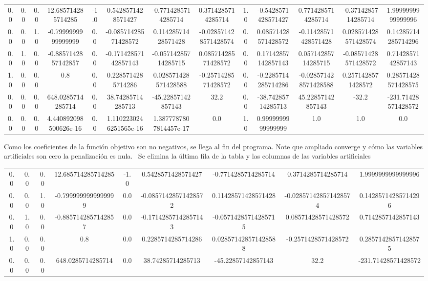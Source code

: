 \documentclass{article} %
\begin{document}
\begin{center}
\begin{tabular}{|cccccccccccc|c|}\hline
0.0 & 0.0 & 0.0 & 12.685714285714285 & -1.0 & 0.5428571428571427 & -0.7714285714285714 & 0.3714285714285714 & 1.0 & -0.5428571428571427 & 0.7714285714285714 & -0.3714285714285714 & 1.9999999999999996  \\
0.0 & 0.0 & 1.0 & -0.7999999999999999 & 0.0 & -0.08571428571428572 & 0.11428571428571428 & -0.028571428571428574 & 0.0 & 0.08571428571428572 & -0.11428571428571428 & 0.028571428571428574 & 0.14285714285714296  \\
0.0 & 1.0 & 0.0 & -0.8857142857142857 & 0.0 & -0.17142857142857143 & -0.05714285714285715 & 0.08571428571428572 & 0.0 & 0.17142857142857143 & 0.05714285714285715 & -0.08571428571428572 & 0.7142857142857143  \\
1.0 & 0.0 & 0.0 & 0.8 & 0.0 & 0.2285714285714286 & 0.028571428571428588 & -0.2571428571428572 & 0.0 & -0.2285714285714286 & -0.028571428571428588 & 0.2571428571428572 & 0.28571428571428575  \\
\hline
0.0 & 0.0 & 0.0 & 648.0285714285714 & 0.0 & 38.74285714285713 & -45.22857142857143 & 32.2 & 0.0 & -38.74285714285713 & 45.22857142857143 & -32.2 & -231.71428571428572  \\
0.0 & 0.0 & 0.0 & 4.440892098500626e-16 & 0.0 & 1.1102230246251565e-16 & 1.3877787807814457e-17 & 0.0 & 1.0 & 0.9999999999999999 & 1.0 & 1.0 & 0.0  \\
\hline
\end{tabular}
\end{center}
Como los coeficientes de la función objetivo son no negativos, se llega al fin del programa.
Note que ampliado converge y cómo las variables artificiales son cero la penalización es nula. \
Se elimina la última fila de la tabla y las columnas de las variables artificiales
\begin{center}
\begin{tabular}{|cccccccc|c|}\hline
0.0 & 0.0 & 0.0 & 12.685714285714285 & -1.0 & 0.5428571428571427 & -0.7714285714285714 & 0.3714285714285714 & 1.9999999999999996  \\
0.0 & 0.0 & 1.0 & -0.7999999999999999 & 0.0 & -0.08571428571428572 & 0.11428571428571428 & -0.028571428571428574 & 0.14285714285714296  \\
0.0 & 1.0 & 0.0 & -0.8857142857142857 & 0.0 & -0.17142857142857143 & -0.05714285714285715 & 0.08571428571428572 & 0.7142857142857143  \\
1.0 & 0.0 & 0.0 & 0.8 & 0.0 & 0.2285714285714286 & 0.028571428571428588 & -0.2571428571428572 & 0.28571428571428575  \\
\hline
0.0 & 0.0 & 0.0 & 648.0285714285714 & 0.0 & 38.74285714285713 & -45.22857142857143 & 32.2 & -231.71428571428572  \\
\hline
\end{tabular}
\end{center}
\end{document}
